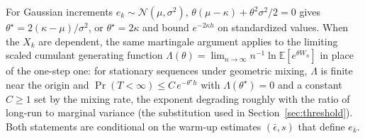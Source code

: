 \documentclass[letterpaper, 10 pt, conference]{ieeeconf}  %
\newcommand{\E}{\mathbb{E}}
\newcommand{\cN}{\mathcal{N}}
\begin{document}
For Gaussian increments $e_k \sim \cN(\mu,\sigma^2)$, $\theta(\mu-\kappa) + \theta^2\sigma^2/2 = 0$ gives $\theta^{\star} = 2(\kappa-\mu)/\sigma^2$, or $\theta^\star = 2\kappa$ and bound $e^{-2\kappa h}$ on standardized values.
When the $X_k$ are dependent, the same martingale argument applies to the limiting scaled cumulant generating function $\Lambda(\theta) = \lim_{n\to\infty} n^{-1}\ln\E[e^{\theta W_n}]$ in place of the one-step one: for stationary sequences under geometric mixing, $\Lambda$ is finite near the origin and $\Pr(T<\infty) \leq C\,e^{-\theta^{\star} h}$ with $\Lambda(\theta^{\star})=0$ and a constant $C\geq1$ set by the mixing rate, the exponent degrading roughly with the ratio of long-run to marginal variance (the substitution used in Section~\ref{sec:threshold}).
Both statements are conditional on the warm-up estimates $(\bar{\epsilon}, s)$ that define $e_k$.




\end{document}
